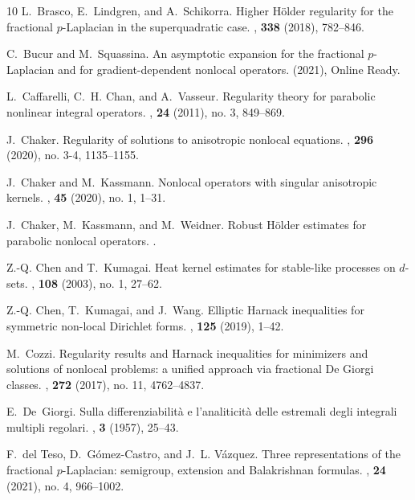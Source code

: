 \documentclass[11pt]{amsart}
\theoremstyle{plain}
\theoremstyle{definition}
\numberwithin{equation}{section}
\begin{document}
\begin{thebibliography}{10}
L.~Brasco, E.~Lindgren, and A.~Schikorra.
\newblock Higher {H}\"{o}lder regularity for the fractional {$p$}-{L}aplacian
  in the superquadratic case.
, \textbf{338} (2018), 782--846.

C.~Bucur and M.~Squassina.
\newblock An asymptotic expansion for the fractional $p$-{L}aplacian and for
  gradient-dependent nonlocal operators.
 (2021), Online Ready.

L.~Caffarelli, C.~H. Chan, and A.~Vasseur.
\newblock Regularity theory for parabolic nonlinear integral operators.
, \textbf{24} (2011), no. 3, 849--869.

J.~Chaker.
\newblock Regularity of solutions to anisotropic nonlocal equations.
, \textbf{296} (2020), no. 3-4, 1135--1155.

J.~Chaker and M.~Kassmann.
\newblock Nonlocal operators with singular anisotropic kernels.
, \textbf{45} (2020), no. 1, 1--31.

J.~Chaker, M.~Kassmann, and M.~Weidner.
\newblock Robust {H}\"{o}lder estimates for parabolic nonlocal operators.
.

Z.-Q. Chen and T.~Kumagai.
\newblock Heat kernel estimates for stable-like processes on {$d$}-sets.
, \textbf{108} (2003), no. 1, 27--62.

Z.-Q. Chen, T.~Kumagai, and J.~Wang.
\newblock Elliptic {H}arnack inequalities for symmetric non-local {D}irichlet
  forms.
, \textbf{125} (2019), 1--42.

M.~Cozzi.
\newblock Regularity results and {H}arnack inequalities for minimizers and
  solutions of nonlocal problems: a unified approach via fractional {D}e
  {G}iorgi classes.
, \textbf{272} (2017), no. 11, 4762--4837.

E.~De~Giorgi.
\newblock Sulla differenziabilit\`a e l'analiticit\`a delle estremali degli
  integrali multipli regolari.
, \textbf{3} (1957), 25--43.

F.~del Teso, D.~G\'{o}mez-Castro, and J.~L. V\'{a}zquez.
\newblock Three representations of the fractional {$p$}-{L}aplacian: semigroup,
  extension and {B}alakrishnan formulas.
, \textbf{24} (2021), no. 4, 966--1002.


\end{thebibliography}
\end{document}
